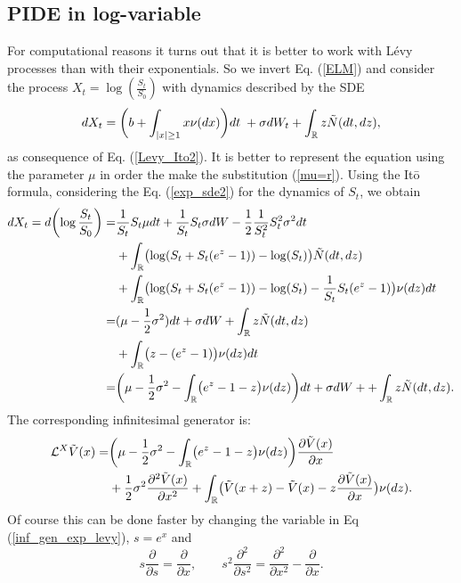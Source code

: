 \subsection{PIDE in log-variable}\label{log_var_section}

For computational reasons it turns out that it is better to work with Lévy processes than with their exponentials. So we invert Eq. (\ref{ELM})
and consider the process $ X_t = \log \left( \frac{S_t}{S_0} \right)$ with dynamics described by the SDE 
\begin{equation}\label{SDE_log_var}
 dX_t = \biggl( b + \int_{|x|\geq 1}x \nu(dx) \biggr) dt \; + \sigma dW_t + \int_{\mathbb{R}} z \tilde N(dt,dz),
\end{equation}
as consequence of Eq. (\ref{Levy_Ito2}). It is better to represent the equation using the parameter $\mu$ in order the make the substitution (\ref{mu=r}). Using the It\=o formula,
considering the Eq. (\ref{exp_sde2}) for the dynamics of $S_t$, we obtain
\begin{align*}
 dX_t = d\biggl( \log \frac{S_t}{S_0}\biggr) =& \frac{1}{S_t} S_t \mu dt + \frac{1}{S_t} S_t \sigma dW - \frac{1}{2} \frac{1}{S_t^2} S_t^2 \sigma^2 dt \\
 &  + \int_{\mathbb{R}} \bigl( \log(S_t+S_t(e^z-1)) - \log(S_t) \bigr) \tilde N(dt,dz) \\
 &  + \int_{\mathbb{R}} \bigl( \log(S_t+S_t(e^z-1)) - \log(S_t) -\frac{1}{S_t} S_t (e^z-1) \bigr) \nu(dz)dt \\
 =& (\mu-\frac{1}{2}\sigma^2)dt + \sigma dW + \int_{\mathbb{R}} z \tilde N(dt,dz) \\
 &  + \int_{\mathbb{R}} \bigl( z - (e^z-1) \bigr) \nu(dz) dt \\
 =& \biggl( \mu-\frac{1}{2}\sigma^2 - \int_{\mathbb{R}} \bigl( e^z-1-z \bigr) \nu(dz) \biggr)dt + \sigma dW + + \int_{\mathbb{R}} z \tilde N(dt,dz).
\end{align*}
The corresponding infinitesimal generator is:
\begin{align}\label{RN_log_gen}
 \mathcal{L}^X \tilde V(x) =& \biggl( \mu-\frac{1}{2}\sigma^2 - \int_{\mathbb{R}} \bigl( e^z-1-z \bigr) \nu(dz) \biggr) \frac{\partial \tilde V(x)}{\partial x} \\ \nonumber
          &+ \frac{1}{2} \sigma^2 \frac{\partial^2 \tilde V(x)}{\partial x^2} 
          + \int_{\mathbb{R}} \bigl( \tilde V(x+z)- \tilde V(x) - z \frac{\partial \tilde V(x)}{\partial x} \bigr) \nu(dz).
\end{align}
Of course this can be done faster by changing the variable in Eq (\ref{inf_gen_exp_levy}), $s = e^x$ and 
\begin{equation}\label{log_var}
s \frac{\partial}{\partial s} = \frac{\partial}{\partial x}, \hspace{2em} 
s^2 \frac{\partial^2}{\partial s^2} = \frac{\partial^2}{\partial x^2} - \frac{\partial}{\partial x} . 
\end{equation}

